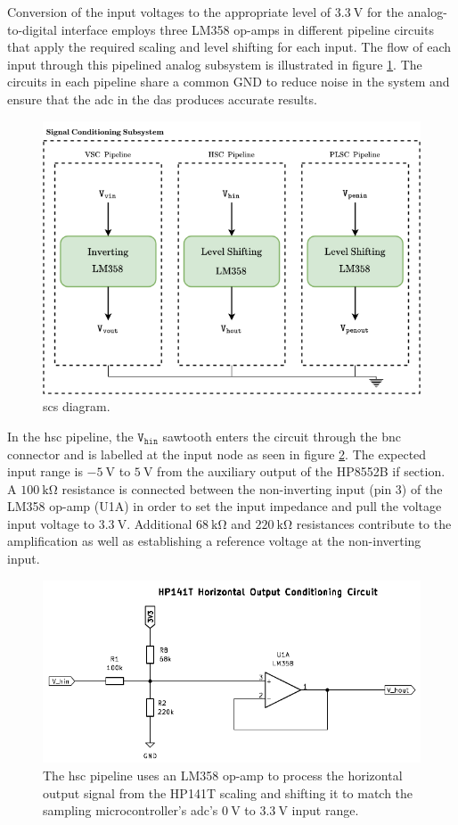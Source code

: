 \documentclass[class=report,11pt,crop=false]{standalone}
\begin{document}
	Conversion of the input voltages to the appropriate level of $\SI{3.3}{\volt}$ for the analog-to-digital interface employs three LM358 op-amps in different pipeline circuits that apply the required scaling and level shifting for each input. The flow of each input through this pipelined analog subsystem is illustrated in figure \ref{fig:sig-cond-subsystem-diagram}. The circuits in each pipeline share a common GND to reduce noise in the system and ensure that the \acrshort{adc} in the \acrshort{das} produces accurate results.
	
	\begin{figure}[h!]
		\centering
		\includegraphics[width=0.55\linewidth]{Figures/Methodology/sig-cond-subsystem-diagram}
		\caption{\acrlong{scs} diagram.}
		\label{fig:sig-cond-subsystem-diagram}
	\end{figure}

	In the \acrfull{hsc} pipeline, the $\texttt{V}_\texttt{hin}$ sawtooth enters the circuit through the \acrshort{bnc} connector and is labelled at the input node as seen in figure \ref{fig:sig-cond-hsc-schematic}. The expected input range is $-\SI{5}{\volt}$ to $\SI{5}{\volt}$ from the auxiliary output of the HP8552B \acrshort{if} section. A $\SI{100}{\kilo\ohm}$ resistance is connected between the non-inverting input (pin 3) of the LM358 op-amp (U1A) in order to set the input impedance and pull the voltage input voltage to $\SI{3.3}{\volt}$. Additional $\SI{68}{\kilo\ohm}$ and $\SI{220}{\kilo\ohm}$ resistances contribute to the amplification as well as establishing a reference voltage at the non-inverting input. 
	
	\begin{figure}[h!]
		\centering
		\includegraphics[width=0.55\linewidth]{Figures/Methodology/sig-cond-hsc-schematic}
		\caption{The \acrshort{hsc} pipeline uses an LM358 op-amp to process the horizontal output signal from the HP141T scaling and shifting it to match the sampling microcontroller's \acrshort{adc}'s $\SI{0}{\volt}$ to $\SI{3.3}{\volt}$ input range.}
		\label{fig:sig-cond-hsc-schematic}
	\end{figure}
\end{document}
